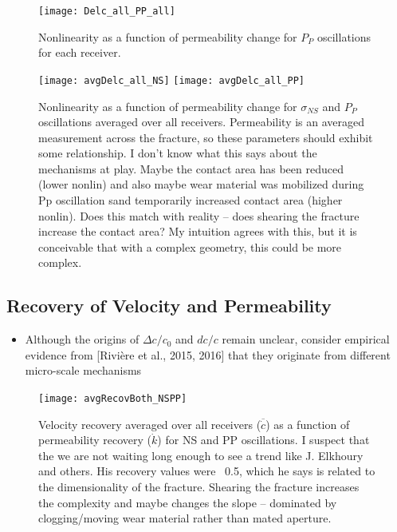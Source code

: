 \documentclass[letterpaper,10pt]{article}
\begin{document}
\newpage

\begin{figure}[ht]
	\centering
	\texttt{[image: Delc\_all\_PP\_all]}
	\caption{Nonlinearity as a function of permeability change for $ P_P $ oscillations for each receiver.}
	\label{fig:delc_plots2}
\end{figure}

\newpage

\begin{figure}[ht]
	\centering
	\texttt{[image: avgDelc\_all\_NS]}
	\texttt{[image: avgDelc\_all\_PP]}
	\caption{Nonlinearity as a function of permeability change for $ \sigma_{NS} $ and $ P_P $ oscillations averaged over all receivers. Permeability is an averaged measurement across the fracture, so these parameters should exhibit some relationship. I don’t know what this says about the mechanisms at play. Maybe the contact area has been reduced (lower nonlin) and also maybe wear material was mobilized during Pp oscillation sand temporarily increased contact area (higher nonlin). Does this match with reality -- does shearing the fracture increase the contact area? My intuition agrees with this, but it is conceivable that with a complex geometry, this could be more complex.}
	\label{fig:delc_plots2}
\end{figure}

\newpage

\subsection{Recovery of Velocity and Permeability}
\begin{itemize}
	\item Although the origins of $ \Delta c/c_0 $ and $ dc/c $ remain unclear, consider empirical evidence from [Rivière et al., 2015, 2016] that they originate from different micro-scale mechanisms 
\end{itemize}


\begin{figure}[ht]
	\centering
	\texttt{[image: avgRecovBoth\_NSPP]}
	\caption{Velocity recovery averaged over all receivers ($ \overline {\dot c} $) as a function of permeability recovery ($ \dot k $) for NS and PP oscillations. 
	I suspect that the we are not waiting long enough to see a trend like J. Elkhoury and others. His recovery values were ~0.5, which he says is related to the dimensionality of the fracture. Shearing the fracture increases the complexity and maybe changes the slope -- dominated by clogging/moving wear material rather than mated aperture.}
	\label{fig:delc_plots2}
\end{figure}
\end{document}
